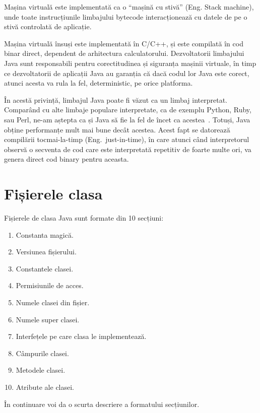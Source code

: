Mașina virtuală este implementată ca o ``mașină cu stivă'' (Eng. Stack
machine), unde toate instrucțiunile limbajului bytecode interacționează
cu datele de pe o stivă controlată de aplicație.

Mașina virtuală însuși este implementată în C/C++, și este compilată în
cod binar direct, dependent de arhitectura calculatorului. Dezvoltatorii limbajului
Java sunt responsabili pentru corectitudinea și siguranța mașinii
virtuale, în timp ce dezvoltatorii de aplicații Java au garanția că dacă
codul lor Java este corect, atunci acesta va rula la fel, deterministic,
pe orice platforma.

În acestă privință, limbajul Java poate fi văzut ca un limbaj interpretat.
Comparând cu alte limbaje populare interpretate, ca de exemplu Python,
Ruby, sau Perl, ne-am aștepta ca și Java să fie la fel de încet ca
acestea~\cite{language_benchmarks}.
Totuși, Java obține performanțe mult mai bune decât
acestea. Acest fapt se datorează compilării tocmai-la-timp (Eng.\
just-in-time), în care atunci când interpretorul observă o secventa de
cod care este interpretată repetitiv de foarte multe ori, va genera
direct cod binary pentru aceasta.


\section{Fișierele clasa}

Fișierele de clasa Java sunt formate din 10
secțiuni\cite{classfile_sections}:

\begin{enumerate}
	\item
	      Constanta magică.
	\item
	      Versiunea fișierului.
	\item
	      Constantele clasei.
	\item
	      Permisiunile de acces.
	\item
	      Numele clasei din fișier.
	\item
	      Numele super clasei.
	\item
	      Interfețele pe care clasa le implementează.
	\item
	      Câmpurile clasei.
	\item
	      Metodele clasei.
	\item
	      Atribute ale clasei.
\end{enumerate}

În continuare voi da o scurta descriere a formatului secțiunilor.

